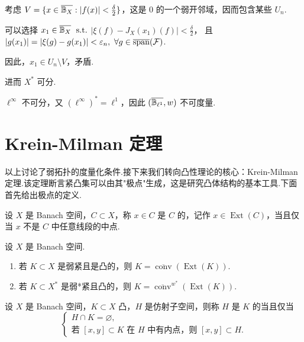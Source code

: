 考虑 $V=\{x\in \overline{\mathbb{B}_X}: |f(x)|<\frac{\delta}{2}\}$，这是 $0$ 的一个弱开邻域，因而包含某些 $U_n$.\par
可以选择 $x_1\in \overline{\mathbb{B}_X}$ $\operatorname{\,\text{s.t.}}$ $|\xi(f)-J_X(x_1)(f)|<\frac{\delta}{2}$，
且 $|g(x_1)| = |\xi(g)-g(x_1)|<\varepsilon_n,\ \forall g\in \overline{\operatorname{span}}(\mathcal{F})$.\par
因此，$x_1\in U_n\setminus V$，矛盾.\par
进而 $X^*$ 可分.

$\ell^\infty$ 不可分，又 $(\ell^\infty)^* = \ell^1$，因此 $(\overline{\mathbb{B}_{\ell^1}}, w)$ 不可度量.


\section{Krein-Milman 定理}
以上讨论了弱拓扑的度量化条件.接下来我们转向凸性理论的核心：Krein-Milman 定理.该定理断言紧凸集可以由其"极点"生成，这是研究凸体结构的基本工具.下面首先给出极点的定义.

\begin{definition}[极点]
    设 $X$ 是 Banach 空间，$C\subset X$，称 $x\in C$ 是 $C$ 的，记作 $x\in \operatorname{Ext}(C)$，当且仅当 $x$ 不是 $C$ 中任意线段的中点.
\end{definition}

\begin{theorem}
    设 $X$ 是 Banach 空间.
    \begin{enumerate}
        \item[(i)] 若 $K\subset X$ 是弱紧且是凸的，则 $K = \overline{\operatorname{conv}}(\operatorname{Ext}(K))$.
        \item[(ii)] 若 $K\subset X^*$ 是弱*紧且凸的，则 $K = \overline{\operatorname{conv}}^{w^*}(\operatorname{Ext}(K))$.
    \end{enumerate}
\end{theorem}

\begin{definition}[支撑流形]
    设 $X$ 是 Banach 空间，$K\subset X$ 凸，$H$ 是仿射子空间，则称 $H$ 是 $K$ 的当且仅当
    \[
    \begin{cases}
    H\cap K = \varnothing,\\
    \text{若 } [x,y]\subset K \text{ 在 } H \text{ 中有内点，则 } [x,y]\subset H.
    \end{cases}
    \]
\end{definition}

